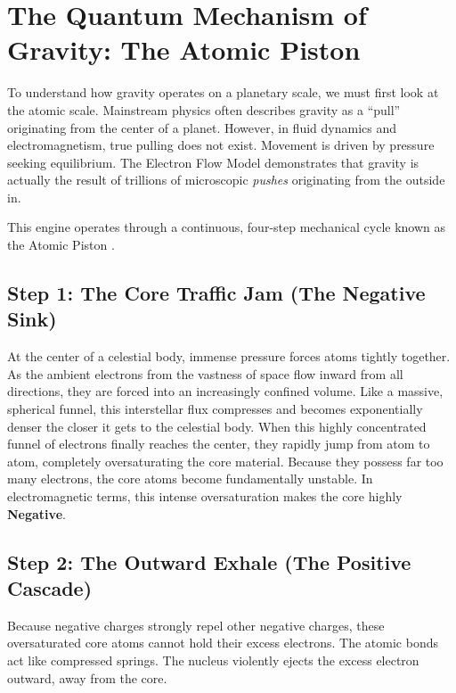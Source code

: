 \documentclass[11pt, a4paper]{article}
\begin{document}
\section{The Quantum Mechanism of Gravity: The Atomic Piston}

To understand how gravity operates on a planetary scale, we must first look at the atomic scale. Mainstream physics often describes gravity as a ``pull'' originating from the center of a planet. However, in fluid dynamics and electromagnetism, true pulling does not exist. Movement is driven by pressure seeking equilibrium. The Electron Flow Model demonstrates that gravity is actually the result of trillions of microscopic \textit{pushes} originating from the outside in. 

This engine operates through a continuous, four-step mechanical cycle known as the Atomic Piston \cite{marabut2026m1}.

\subsection{Step 1: The Core Traffic Jam (The Negative Sink)}
At the center of a celestial body, immense pressure forces atoms tightly together. As the ambient electrons from the vastness of space flow inward from all directions, they are forced into an increasingly confined volume. Like a massive, spherical funnel, this interstellar flux compresses and becomes exponentially denser the closer it gets to the celestial body. When this highly concentrated funnel of electrons finally reaches the center, they rapidly jump from atom to atom, completely oversaturating the core material. Because they possess far too many electrons, the core atoms become fundamentally unstable. In electromagnetic terms, this intense oversaturation makes the core highly \textbf{Negative}.

\subsection{Step 2: The Outward Exhale (The Positive Cascade)}
Because negative charges strongly repel other negative charges, these oversaturated core atoms cannot hold their excess electrons. The atomic bonds act like compressed springs. The nucleus violently ejects the excess electron outward, away from the core. 
\end{document}
